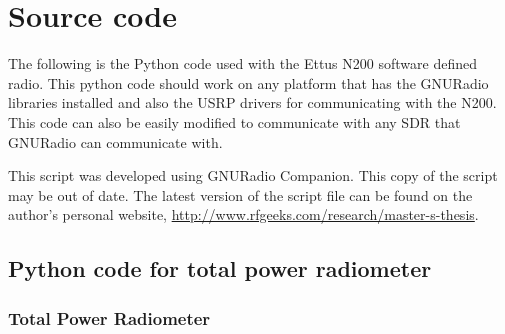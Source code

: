 \appendixtitle
\appendix
\chapter{Source code}

The following is the Python code used with the Ettus N200 software defined radio.  This python code should work on any platform that has the GNURadio libraries installed and also the USRP drivers for communicating with the N200.  This code can also be easily modified to communicate with any SDR that GNURadio can communicate with.  

This script was developed using GNURadio Companion.  This copy of the script may be out of date.  The latest version of the script file can be found on the author's personal website, \url{http://www.rfgeeks.com/research/master-s-thesis}.


\section*{Python code for total power radiometer}

\newcommand{\code}[2]{
  \hrulefill
  \subsection*{#1}
  
  \vspace{2em}
}

\code{Total Power Radiometer}{Code/N200_TPR.py}

